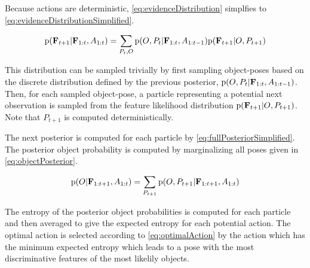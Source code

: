                 Because actions are deterministic, \eqref{eq:evidenceDistribution} simplfies to \eqref{eq:evidenceDistributionSimplified}.

                \begin{equation}
                    \label{eq:evidenceDistributionSimplified}
                    \text{p}(\mathbf{F}_{t+1}|\mathbf{F}_{1:t}, A_{1:t}) = \sum_{P_t,O} \text{p}(O,P_t|\mathbf{F}_{1:t},A_{1:t-1}) \text{p}(\mathbf{F}_{t+1}|O,P_{t+1})
                \end{equation}

                This distribution can be sampled trivially by first sampling object-poses based on the discrete distribution defined by the previous posterior, $\text{p}(O,P_t|\mathbf{F}_{1:t},A_{1:t-1})$. Then, for each sampled object-pose, a particle representing a potential next observation is sampled from the feature likelihood distribution $\text{p}(\mathbf{F}_{t+1}|O,P_{t+1})$. Note that $P_{t+1}$ is computed deterministically.

                The next posterior is computed for each particle by \eqref{eq:fullPosteriorSimplified}. The posterior object probability is computed by marginalizing all poses given in \eqref{eq:objectPosterior}.

                \begin{equation}
                    \label{eq:objectPosterior}
                    \text{p}(O|\mathbf{F}_{1:t+1},A_{1:t}) = \sum_{P_{t+1}} \text{p}(O,P_{t+1}|\mathbf{F}_{1:t+1},A_{1:t})
                \end{equation}

                The entropy of the posterior object probabilities is computed for each particle and then averaged to give the expected entropy for each potential action. The optimal action is selected according to \eqref{eq:optimalAction} by the action which has the minimum expected entropy which leads to a pose with the most discriminative features of the most likelily objects.
